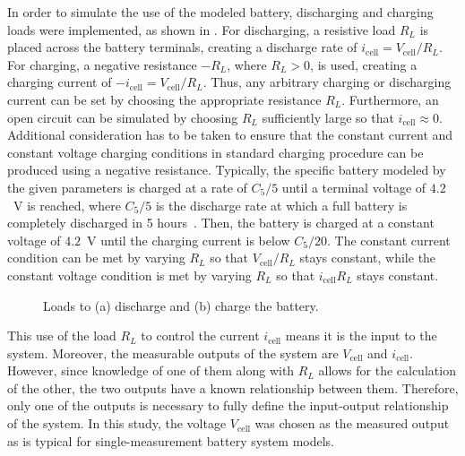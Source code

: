 \documentclass[../zhang_thesis.tex]{subfiles}
\begin{document}
In order to simulate the use of the modeled battery, discharging and charging loads were implemented, as shown in . For discharging, a resistive load $R_L$ is placed across the battery terminals, creating a discharge rate of $i_\text{cell}=V_\text{cell}/R_L$. For charging, a negative resistance $-R_L$, where $R_L>0$, is used, creating a charging current of $-i_\text{cell}=V_\text{cell}/R_L$. Thus, any arbitrary charging or discharging current can be set
by choosing the appropriate resistance $R_L$. Furthermore, an open circuit can be simulated by choosing $R_L$ sufficiently large so that $i_\text{cell}\approx 0$. Additional consideration has to be taken to ensure that the constant current and constant voltage charging conditions in standard charging procedure can be produced using a negative resistance. Typically, the specific battery modeled by the given parameters is charged at a rate of $C_5/5$ until a terminal voltage of $4.2$~V is reached, where $C_5/5$ is the discharge
rate at which a full battery is completely discharged in 5 hours~\cite{linden01_ch3}. Then, the battery is charged at a constant voltage of $4.2$~V until the charging current is below $C_5/20$. The constant current condition can be met by varying $R_L$ so that $V_\text{cell}/R_L$ stays constant, while the constant voltage condition is met by varying $R_L$ so that $i_\text{cell} R_L$ stays constant.

\begin{figure}[ht]
\centering
\begin{subfigure}[c]{0.4\textwidth}
    
\end{subfigure}
\begin{subfigure}[c]{0.55\textwidth}
    
\end{subfigure}
\caption{Loads to (a) discharge and (b) charge the battery.}
\label{fig:batt_loads}
\end{figure}

This use of the load $R_L$ to control the current $i_\text{cell}$ means it is the input to the system. Moreover, the measurable outputs of the system are $V_\text{cell}$ and $i_\text{cell}$. However, since knowledge of one of them along with $R_L$ allows for the calculation of the other, the two outputs have a known relationship between them. Therefore, only one of the outputs is necessary to fully define the input-output relationship of the system. In this study, the voltage
$V_\text{cell}$ was chosen as the measured output as is typical for single-measurement battery system models.
\end{document}
